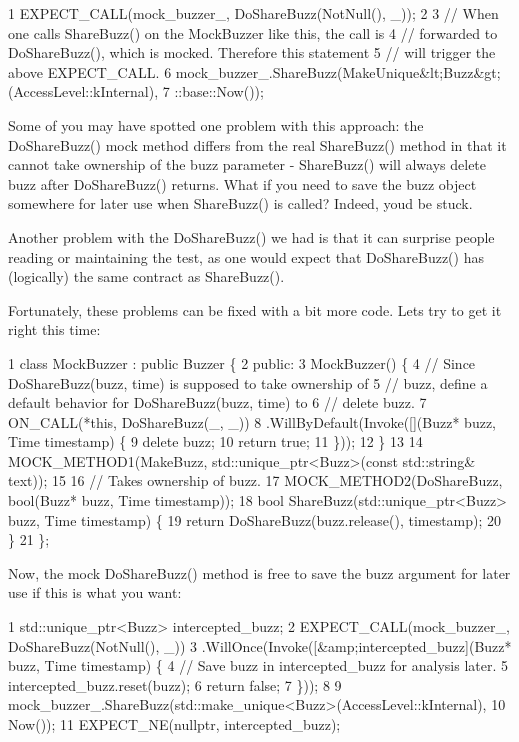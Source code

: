 \begin{DoxyCode}
1 EXPECT\_CALL(mock\_buzzer\_, DoShareBuzz(NotNull(), \_));
2 
3 // When one calls ShareBuzz() on the MockBuzzer like this, the call is
4 // forwarded to DoShareBuzz(), which is mocked.  Therefore this statement
5 // will trigger the above EXPECT\_CALL.
6 mock\_buzzer\_.ShareBuzz(MakeUnique&lt;Buzz&gt;(AccessLevel::kInternal),
7                        ::base::Now());
\end{DoxyCode}


Some of you may have spotted one problem with this approach\+: the {\ttfamily Do\+Share\+Buzz()} mock method differs from the real {\ttfamily Share\+Buzz()} method in that it cannot take ownership of the buzz parameter -\/ {\ttfamily Share\+Buzz()} will always delete buzz after {\ttfamily Do\+Share\+Buzz()} returns. What if you need to save the buzz object somewhere for later use when {\ttfamily Share\+Buzz()} is called? Indeed, you\textquotesingle{}d be stuck.

Another problem with the {\ttfamily Do\+Share\+Buzz()} we had is that it can surprise people reading or maintaining the test, as one would expect that {\ttfamily Do\+Share\+Buzz()} has (logically) the same contract as {\ttfamily Share\+Buzz()}.

Fortunately, these problems can be fixed with a bit more code. Let\textquotesingle{}s try to get it right this time\+:


\begin{DoxyCode}
1 class MockBuzzer : public Buzzer \{
2  public:
3   MockBuzzer() \{
4     // Since DoShareBuzz(buzz, time) is supposed to take ownership of
5     // buzz, define a default behavior for DoShareBuzz(buzz, time) to
6     // delete buzz.
7     ON\_CALL(*this, DoShareBuzz(\_, \_))
8         .WillByDefault(Invoke([](Buzz* buzz, Time timestamp) \{
9           delete buzz;
10           return true;
11         \}));
12   \}
13 
14   MOCK\_METHOD1(MakeBuzz, std::unique\_ptr<Buzz>(const std::string& text));
15 
16   // Takes ownership of buzz.
17   MOCK\_METHOD2(DoShareBuzz, bool(Buzz* buzz, Time timestamp));
18   bool ShareBuzz(std::unique\_ptr<Buzz> buzz, Time timestamp) \{
19     return DoShareBuzz(buzz.release(), timestamp);
20   \}
21 \};
\end{DoxyCode}


Now, the mock {\ttfamily Do\+Share\+Buzz()} method is free to save the buzz argument for later use if this is what you want\+:


\begin{DoxyCode}
1 std::unique\_ptr<Buzz> intercepted\_buzz;
2 EXPECT\_CALL(mock\_buzzer\_, DoShareBuzz(NotNull(), \_))
3     .WillOnce(Invoke([&amp;intercepted\_buzz](Buzz* buzz, Time timestamp) \{
4       // Save buzz in intercepted\_buzz for analysis later.
5       intercepted\_buzz.reset(buzz);
6       return false;
7     \}));
8 
9 mock\_buzzer\_.ShareBuzz(std::make\_unique<Buzz>(AccessLevel::kInternal),
10                        Now());
11 EXPECT\_NE(nullptr, intercepted\_buzz);
\end{DoxyCode}


